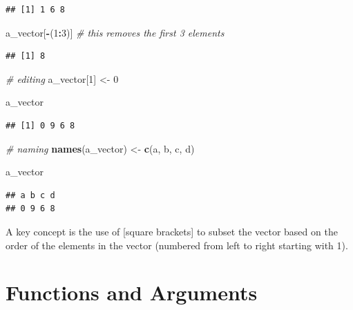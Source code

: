 \documentclass[
]{book}
\newenvironment{Shaded}{\begin{snugshade}}{\end{snugshade}}
\newcommand{\CommentTok}[1]{\textcolor[rgb]{0.56,0.35,0.01}{\textit{#1}}}
\newcommand{\DecValTok}[1]{\textcolor[rgb]{0.00,0.00,0.81}{#1}}
\newcommand{\FunctionTok}[1]{\textcolor[rgb]{0.13,0.29,0.53}{\textbf{#1}}}
\newcommand{\NormalTok}[1]{#1}
\newcommand{\OtherTok}[1]{\textcolor[rgb]{0.56,0.35,0.01}{#1}}
\newcommand{\SpecialCharTok}[1]{\textcolor[rgb]{0.81,0.36,0.00}{\textbf{#1}}}
\newcommand{\StringTok}[1]{\textcolor[rgb]{0.31,0.60,0.02}{#1}}
\begin{document}
\begin{verbatim}
## [1] 1 6 8
\end{verbatim}

\begin{Shaded}
\begin{Highlighting}[]
\NormalTok{a\_vector[}\SpecialCharTok{{-}}\NormalTok{(}\DecValTok{1}\SpecialCharTok{:}\DecValTok{3}\NormalTok{)] }\CommentTok{\# this removes the first 3 elements}
\end{Highlighting}
\end{Shaded}

\begin{verbatim}
## [1] 8
\end{verbatim}

\begin{Shaded}
\begin{Highlighting}[]
\CommentTok{\# editing}
\NormalTok{a\_vector[}\DecValTok{1}\NormalTok{] }\OtherTok{\textless{}{-}} \DecValTok{0}

\NormalTok{a\_vector}
\end{Highlighting}
\end{Shaded}

\begin{verbatim}
## [1] 0 9 6 8
\end{verbatim}

\begin{Shaded}
\begin{Highlighting}[]
\CommentTok{\# naming}
\FunctionTok{names}\NormalTok{(a\_vector) }\OtherTok{\textless{}{-}} \FunctionTok{c}\NormalTok{(}\StringTok{\textquotesingle{}a\textquotesingle{}}\NormalTok{, }\StringTok{\textquotesingle{}b\textquotesingle{}}\NormalTok{, }\StringTok{\textquotesingle{}c\textquotesingle{}}\NormalTok{, }\StringTok{\textquotesingle{}d\textquotesingle{}}\NormalTok{)}

\NormalTok{a\_vector}
\end{Highlighting}
\end{Shaded}

\begin{verbatim}
## a b c d 
## 0 9 6 8
\end{verbatim}

A key concept is the use of {[}square brackets{]} to subset the vector based on the order of the elements in the vector (numbered from left to right starting with 1).

\section{Functions and Arguments}\label{functions-and-arguments}
\end{document}
